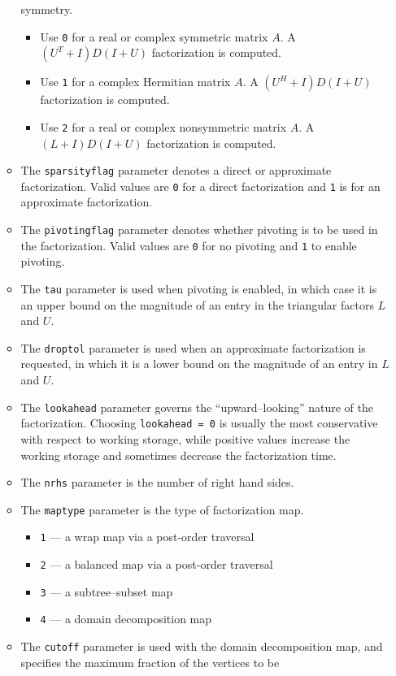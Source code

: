 \begin{enumerate}
\begin{itemize}
symmetry.
\begin{itemize}
\item
Use {\tt 0} for a real or complex symmetric matrix $A$.
A $(U^T + I)D(I + U)$ factorization is computed.
\item
Use {\tt 1} for a complex Hermitian matrix $A$.
A $(U^H + I)D(I + U)$ factorization is computed.
\item
Use {\tt 2} for a real or complex nonsymmetric matrix $A$.
A $(L + I)D(I + U)$ factorization is computed.
\end{itemize}
\item
The {\tt sparsityflag} parameter denotes a direct or approximate
factorization.
Valid values are {\tt 0} for a direct factorization
and {\tt 1} is for an approximate factorization.
\item
The {\tt pivotingflag} parameter denotes whether pivoting is to be
used in the factorization.
Valid values are {\tt 0} for no pivoting
and {\tt 1} to enable pivoting.
\item
The {\tt tau} parameter is used when pivoting is enabled,
in which case it is an upper bound on the magnitude of an entry in
the triangular factors $L$ and $U$.
\item
The {\tt droptol} parameter is used when an approximate
factorization is requested, in which it is a lower bound on the
magnitude of an entry in $L$ and $U$.
\item
The {\tt lookahead} parameter governs the
``upward--looking'' nature of the factorization.
Choosing {\tt lookahead = 0} is usually the most conservative with
respect to working storage, while positive values increase the
working storage and sometimes decrease the factorization time.
\item
The {\tt nrhs} parameter is the number of right hand sides.
\item
The {\tt maptype} parameter is the type of factorization map.
\begin{itemize}
\item {\tt 1} --- a wrap map via a post-order traversal
\item {\tt 2} --- a balanced map via a post-order traversal
\item {\tt 3} --- a subtree--subset map
\item {\tt 4} --- a domain decomposition map
\end{itemize}
\item
The {\tt cutoff} parameter is used with the domain decomposition
map, and specifies the maximum fraction of the vertices to be

\end{itemize}
\end{enumerate}
